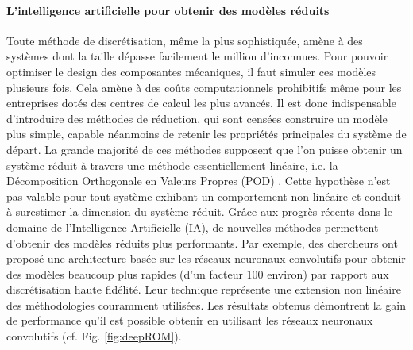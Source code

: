 \documentclass[12pt, french]{article}
\begin{document}
	\paragraph{\large L'intelligence artificielle pour obtenir des modèles réduits\\}
	Toute méthode de discrétisation, même la plus sophistiquée, amène à des systèmes dont la taille dépasse facilement le million d'inconnues. Pour pouvoir optimiser le design des composantes mécaniques, il faut simuler ces modèles plusieurs fois. Cela amène à des coûts computationnels prohibitifs même pour les entreprises dotés des centres de calcul les plus avancés. Il est donc indispensable d'introduire des méthodes de réduction, qui sont censées construire un modèle plus simple, capable néanmoins de retenir les propriétés principales du système de départ. La grande majorité de ces méthodes supposent que l'on puisse obtenir un système réduit à travers une méthode essentiellement linéaire, i.e. la Décomposition Orthogonale en Valeurs Propres (POD) \cite{shinde2019,tello2020fluid}. Cette hypothèse n'est pas valable pour tout système exhibant un comportement non-linéaire et conduit à surestimer la dimension du système réduit. Grâce aux progrès récents dans le domaine de l'Intelligence Artificielle (IA), de nouvelles méthodes permettent d'obtenir des modèles réduits plus performants. Par exemple, des chercheurs ont proposé une architecture basée sur les réseaux neuronaux convolutifs \cite{lee2020} pour obtenir des modèles beaucoup plus rapides (d'un facteur 100 environ) par rapport aux discrétisation haute fidélité. Leur technique représente une extension non linéaire des méthodologies couramment utilisées. Les résultats obtenus démontrent la gain de performance qu'il est possible obtenir en utilisant les réseaux neuronaux convolutifs (cf. Fig. \ref{fig:deepROM}).
	
\end{document}
